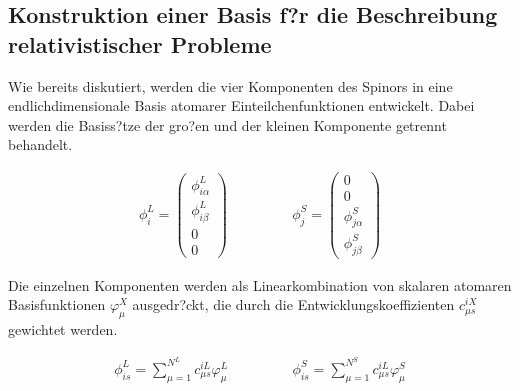 \subsection{Konstruktion einer Basis f?r die Beschreibung relativistischer Probleme}\label{basis}
Wie bereits diskutiert, werden die vier Komponenten des Spinors in eine endlichdimensionale Basis atomarer Einteilchenfunktionen entwickelt. Dabei werden die Basiss?tze der gro?en und der kleinen Komponente getrennt behandelt.

\begin{equation}\begin{array}{ccc}
\phi_i^L = \begin{pmatrix}\phi^L_{i\alpha}\\\phi^L_{i\beta}\\0\\0\end{pmatrix} &\hspace{3em} &\phi_j^S = \begin{pmatrix}0\\0\\\phi^S_{j\alpha}\\\phi^S_{j\beta}\end{pmatrix}
\end{array}\end{equation}

Die einzelnen Komponenten werden als Linearkombination von skalaren atomaren Basisfunktionen $\varphi_\mu^X$ ausgedr?ckt, die durch die Entwicklungskoeffizienten $c_{\mu s}^{iX}$ gewichtet werden.

\begin{equation}\begin{array}{ccc}
\phi^L_{is} = \sum\limits_{\mu=1}^{N^L} c_{\mu s}^{iL} \varphi_\mu^L &\hspace{3em}& \phi^S_{is} = \sum\limits_{\mu=1}^{N^S} c_{\mu s}^{iL} \varphi_\mu^S
\end{array}\end{equation}

